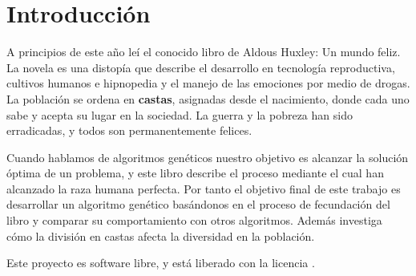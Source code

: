 \chapter{Introducción}

A principios de este año leí el conocido libro de Aldous Huxley: Un mundo feliz. La novela es una
distopía que describe el desarrollo en tecnología reproductiva, cultivos humanos e hipnopedia y el manejo de las
emociones por medio de drogas. La población se ordena en \textbf{castas}, asignadas desde el nacimiento, donde cada uno
sabe y acepta su lugar en la sociedad. La guerra y la pobreza han sido erradicadas, y todos son permanentemente
felices.

Cuando hablamos de algoritmos genéticos nuestro objetivo es alcanzar la solución óptima de un problema, y este libro describe el 
proceso mediante el cual han alcanzado la raza humana perfecta. Por tanto el objetivo final de este trabajo es desarrollar
un algoritmo genético basándonos en el proceso de fecundación del libro y comparar su comportamiento con otros algoritmos. Además
investiga cómo la división en castas afecta la diversidad en la población.

Este proyecto es software libre, y está liberado con la licencia \cite{gplv3}.